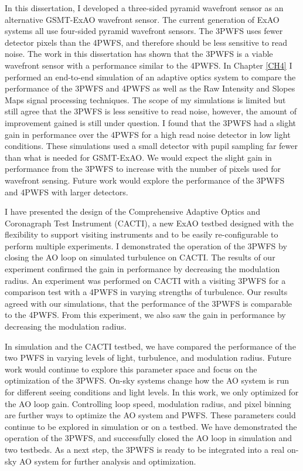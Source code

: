 In this dissertation, I developed a three-sided pyramid wavefront sensor as an alternative GSMT-ExAO wavefront sensor. The current generation of ExAO systems all use four-sided pyramid wavefront sensors. The 3PWFS uses fewer detector pixels than the 4PWFS, and therefore should be less sensitive to read noise. The work in this dissertation has shown that the 3PWFS is a viable wavefront sensor with a performance similar to the 4PWFS. In Chapter \ref{CH4} I performed an end-to-end simulation of an adaptive optics system to compare the performance of the 3PWFS and 4PWFS as well as the Raw Intensity and Slopes Maps signal processing techniques. The scope of my simulations is limited but still agree that the 3PWFS is less sensitive to read noise, however, the amount of improvement gained is still under question. I found that the 3PWFS had a slight gain in performance over the 4PWFS for a high read noise detector in low light conditions. These simulations used a small detector with pupil sampling far fewer than what is needed for GSMT-ExAO. We would expect the slight gain in performance from the 3PWFS to increase with the number of pixels used for wavefront sensing. Future work would explore the performance of the 3PWFS and 4PWFS with larger detectors.

I have presented the design of the Comprehensive Adaptive Optics and Coronagraph Test Instrument (CACTI), a new ExAO testbed designed with the flexibility to support visiting instruments and to be easily re-configurable to perform multiple experiments. I demonstrated the operation of the 3PWFS by closing the AO loop on simulated turbulence on CACTI. The results of our experiment confirmed the gain in performance by decreasing the modulation radius. An experiment was performed on CACTI with a visiting 3PWFS for a comparison test with a 4PWFS in varying strengths of turbulence. Our results agreed with our simulations, that the performance of the 3PWFS is comparable to the 4PWFS. From this experiment, we also saw the gain in performance by decreasing the modulation radius. 

In simulation and the CACTI testbed, we have compared the performance of the two PWFS in varying levels of light, turbulence, and modulation radius. Future work would continue to explore this parameter space and focus on the optimization of the 3PWFS. On-sky systems change how the AO system is run for different seeing conditions and light levels. In this work, we only optimized for the AO loop gain. Controlling loop speed, modulation radius, and pixel binning are further ways to optimize the AO system and PWFS. These parameters could continue to be explored in simulation or on a testbed. We have demonstrated the operation of the 3PWFS, and successfully closed the AO loop in simulation and two testbeds. As a next step, the 3PWFS is ready to be integrated into a real on-sky AO system for further analysis and optimization.




